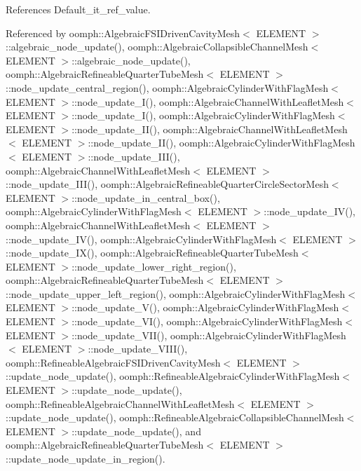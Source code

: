 References Default\+\_\+it\+\_\+ref\+\_\+value.



Referenced by oomph\+::\+Algebraic\+F\+S\+I\+Driven\+Cavity\+Mesh$<$ E\+L\+E\+M\+E\+N\+T $>$\+::algebraic\+\_\+node\+\_\+update(), oomph\+::\+Algebraic\+Collapsible\+Channel\+Mesh$<$ E\+L\+E\+M\+E\+N\+T $>$\+::algebraic\+\_\+node\+\_\+update(), oomph\+::\+Algebraic\+Refineable\+Quarter\+Tube\+Mesh$<$ E\+L\+E\+M\+E\+N\+T $>$\+::node\+\_\+update\+\_\+central\+\_\+region(), oomph\+::\+Algebraic\+Cylinder\+With\+Flag\+Mesh$<$ E\+L\+E\+M\+E\+N\+T $>$\+::node\+\_\+update\+\_\+\+I(), oomph\+::\+Algebraic\+Channel\+With\+Leaflet\+Mesh$<$ E\+L\+E\+M\+E\+N\+T $>$\+::node\+\_\+update\+\_\+\+I(), oomph\+::\+Algebraic\+Cylinder\+With\+Flag\+Mesh$<$ E\+L\+E\+M\+E\+N\+T $>$\+::node\+\_\+update\+\_\+\+I\+I(), oomph\+::\+Algebraic\+Channel\+With\+Leaflet\+Mesh$<$ E\+L\+E\+M\+E\+N\+T $>$\+::node\+\_\+update\+\_\+\+I\+I(), oomph\+::\+Algebraic\+Cylinder\+With\+Flag\+Mesh$<$ E\+L\+E\+M\+E\+N\+T $>$\+::node\+\_\+update\+\_\+\+I\+I\+I(), oomph\+::\+Algebraic\+Channel\+With\+Leaflet\+Mesh$<$ E\+L\+E\+M\+E\+N\+T $>$\+::node\+\_\+update\+\_\+\+I\+I\+I(), oomph\+::\+Algebraic\+Refineable\+Quarter\+Circle\+Sector\+Mesh$<$ E\+L\+E\+M\+E\+N\+T $>$\+::node\+\_\+update\+\_\+in\+\_\+central\+\_\+box(), oomph\+::\+Algebraic\+Cylinder\+With\+Flag\+Mesh$<$ E\+L\+E\+M\+E\+N\+T $>$\+::node\+\_\+update\+\_\+\+I\+V(), oomph\+::\+Algebraic\+Channel\+With\+Leaflet\+Mesh$<$ E\+L\+E\+M\+E\+N\+T $>$\+::node\+\_\+update\+\_\+\+I\+V(), oomph\+::\+Algebraic\+Cylinder\+With\+Flag\+Mesh$<$ E\+L\+E\+M\+E\+N\+T $>$\+::node\+\_\+update\+\_\+\+I\+X(), oomph\+::\+Algebraic\+Refineable\+Quarter\+Tube\+Mesh$<$ E\+L\+E\+M\+E\+N\+T $>$\+::node\+\_\+update\+\_\+lower\+\_\+right\+\_\+region(), oomph\+::\+Algebraic\+Refineable\+Quarter\+Tube\+Mesh$<$ E\+L\+E\+M\+E\+N\+T $>$\+::node\+\_\+update\+\_\+upper\+\_\+left\+\_\+region(), oomph\+::\+Algebraic\+Cylinder\+With\+Flag\+Mesh$<$ E\+L\+E\+M\+E\+N\+T $>$\+::node\+\_\+update\+\_\+\+V(), oomph\+::\+Algebraic\+Cylinder\+With\+Flag\+Mesh$<$ E\+L\+E\+M\+E\+N\+T $>$\+::node\+\_\+update\+\_\+\+V\+I(), oomph\+::\+Algebraic\+Cylinder\+With\+Flag\+Mesh$<$ E\+L\+E\+M\+E\+N\+T $>$\+::node\+\_\+update\+\_\+\+V\+I\+I(), oomph\+::\+Algebraic\+Cylinder\+With\+Flag\+Mesh$<$ E\+L\+E\+M\+E\+N\+T $>$\+::node\+\_\+update\+\_\+\+V\+I\+I\+I(), oomph\+::\+Refineable\+Algebraic\+F\+S\+I\+Driven\+Cavity\+Mesh$<$ E\+L\+E\+M\+E\+N\+T $>$\+::update\+\_\+node\+\_\+update(), oomph\+::\+Refineable\+Algebraic\+Cylinder\+With\+Flag\+Mesh$<$ E\+L\+E\+M\+E\+N\+T $>$\+::update\+\_\+node\+\_\+update(), oomph\+::\+Refineable\+Algebraic\+Channel\+With\+Leaflet\+Mesh$<$ E\+L\+E\+M\+E\+N\+T $>$\+::update\+\_\+node\+\_\+update(), oomph\+::\+Refineable\+Algebraic\+Collapsible\+Channel\+Mesh$<$ E\+L\+E\+M\+E\+N\+T $>$\+::update\+\_\+node\+\_\+update(), and oomph\+::\+Algebraic\+Refineable\+Quarter\+Tube\+Mesh$<$ E\+L\+E\+M\+E\+N\+T $>$\+::update\+\_\+node\+\_\+update\+\_\+in\+\_\+region().


